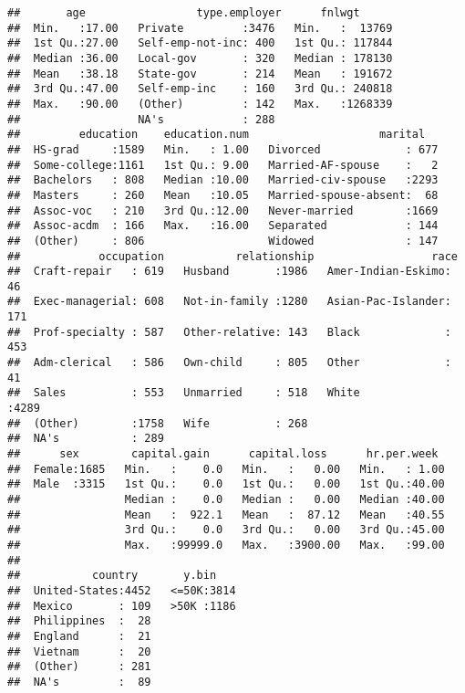 \documentclass[12pt,]{article}
\begin{document}
\begin{verbatim}
##       age                 type.employer      fnlwgt       
##  Min.   :17.00   Private         :3476   Min.   :  13769  
##  1st Qu.:27.00   Self-emp-not-inc: 400   1st Qu.: 117844  
##  Median :36.00   Local-gov       : 320   Median : 178130  
##  Mean   :38.18   State-gov       : 214   Mean   : 191672  
##  3rd Qu.:47.00   Self-emp-inc    : 160   3rd Qu.: 240818  
##  Max.   :90.00   (Other)         : 142   Max.   :1268339  
##                  NA's            : 288                    
##         education    education.num                    marital    
##  HS-grad     :1589   Min.   : 1.00   Divorced             : 677  
##  Some-college:1161   1st Qu.: 9.00   Married-AF-spouse    :   2  
##  Bachelors   : 808   Median :10.00   Married-civ-spouse   :2293  
##  Masters     : 260   Mean   :10.05   Married-spouse-absent:  68  
##  Assoc-voc   : 210   3rd Qu.:12.00   Never-married        :1669  
##  Assoc-acdm  : 166   Max.   :16.00   Separated            : 144  
##  (Other)     : 806                   Widowed              : 147  
##            occupation           relationship                  race     
##  Craft-repair   : 619   Husband       :1986   Amer-Indian-Eskimo:  46  
##  Exec-managerial: 608   Not-in-family :1280   Asian-Pac-Islander: 171  
##  Prof-specialty : 587   Other-relative: 143   Black             : 453  
##  Adm-clerical   : 586   Own-child     : 805   Other             :  41  
##  Sales          : 553   Unmarried     : 518   White             :4289  
##  (Other)        :1758   Wife          : 268                            
##  NA's           : 289                                                  
##      sex        capital.gain      capital.loss      hr.per.week   
##  Female:1685   Min.   :    0.0   Min.   :   0.00   Min.   : 1.00  
##  Male  :3315   1st Qu.:    0.0   1st Qu.:   0.00   1st Qu.:40.00  
##                Median :    0.0   Median :   0.00   Median :40.00  
##                Mean   :  922.1   Mean   :  87.12   Mean   :40.55  
##                3rd Qu.:    0.0   3rd Qu.:   0.00   3rd Qu.:45.00  
##                Max.   :99999.0   Max.   :3900.00   Max.   :99.00  
##                                                                   
##           country       y.bin     
##  United-States:4452   <=50K:3814  
##  Mexico       : 109   >50K :1186  
##  Philippines  :  28               
##  England      :  21               
##  Vietnam      :  20               
##  (Other)      : 281               
##  NA's         :  89
\end{verbatim}
\end{document}
